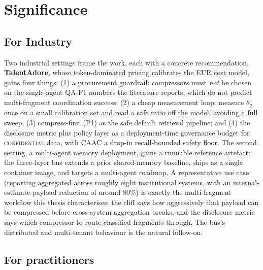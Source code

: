 \section{Significance}
\label{sec:significance}

\subsection{For Industry}
\label{sec:significance_partners}

Two industrial settings frame the work, each with a concrete recommendation. \textbf{TalentAdore}, whose token-dominated
pricing calibrates the EUR cost model, gains four things: (1) a
procurement guardrail: compressors must \emph{not} be chosen on the
single-agent QA-F1 numbers the literature reports, which do not
predict multi-fragment coordination success; (2) a cheap measurement
loop: measure $\theta_q$ once on a small calibration set and read a
safe ratio off the model, avoiding a full sweep; (3) compress-first
(P1) as the safe default retrieval pipeline; and (4) the disclosure
metric plus policy layer as a deployment-time governance budget for
\textsc{confidential} data, with CAAC a drop-in recall-bounded safety
floor. The second setting, a multi-agent memory deployment, gains a
runnable reference artefact: the three-layer bus extends a prior
shared-memory baseline, ships as a single container image, and
targets a multi-agent roadmap. A representative use case
(reporting aggregated across roughly eight institutional systems,
with an internal-estimate payload reduction of around $80\%$) is
exactly the multi-fragment workflow this thesis characterises: the
cliff says how aggressively that payload can be compressed before
cross-system aggregation breaks, and the disclosure metric says which
compressor to route classified fragments through. The bus's
distributed and multi-tenant behaviour is the natural follow-on.

\subsection{For practitioners}

